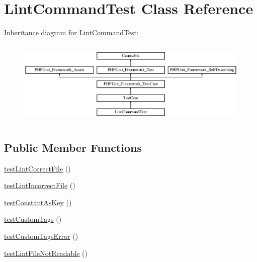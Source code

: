 \hypertarget{class_symfony_1_1_component_1_1_yaml_1_1_tests_1_1_command_1_1_lint_command_test}{}\section{Lint\+Command\+Test Class Reference}
\label{class_symfony_1_1_component_1_1_yaml_1_1_tests_1_1_command_1_1_lint_command_test}
Inheritance diagram for Lint\+Command\+Test\+:\begin{figure}[H]
\begin{center}
\leavevmode
\includegraphics[height=4.129793cm]{class_symfony_1_1_component_1_1_yaml_1_1_tests_1_1_command_1_1_lint_command_test}
\end{center}
\end{figure}
\subsection*{Public Member Functions}
\begin{DoxyCompactItemize}
\item 
\mbox{\hyperlink{class_symfony_1_1_component_1_1_yaml_1_1_tests_1_1_command_1_1_lint_command_test_afd0fc2920ba9c98f95958a8a4bbb24f6}{test\+Lint\+Correct\+File}} ()
\item 
\mbox{\hyperlink{class_symfony_1_1_component_1_1_yaml_1_1_tests_1_1_command_1_1_lint_command_test_ad5b1bd64464d45cc8cece832ae295c87}{test\+Lint\+Incorrect\+File}} ()
\item 
\mbox{\hyperlink{class_symfony_1_1_component_1_1_yaml_1_1_tests_1_1_command_1_1_lint_command_test_abf19d587cc785ab0944ed056846457cc}{test\+Constant\+As\+Key}} ()
\item 
\mbox{\hyperlink{class_symfony_1_1_component_1_1_yaml_1_1_tests_1_1_command_1_1_lint_command_test_ab2f2aecbf9449186a6b2a9777d5719be}{test\+Custom\+Tags}} ()
\item 
\mbox{\hyperlink{class_symfony_1_1_component_1_1_yaml_1_1_tests_1_1_command_1_1_lint_command_test_a59c6fc7e2485a52ac5b130a6aa75198e}{test\+Custom\+Tags\+Error}} ()
\item 
\mbox{\hyperlink{class_symfony_1_1_component_1_1_yaml_1_1_tests_1_1_command_1_1_lint_command_test_ac6ae756ca659f6c7757e4631c4306b35}{test\+Lint\+File\+Not\+Readable}} ()
\end{DoxyCompactItemize}
